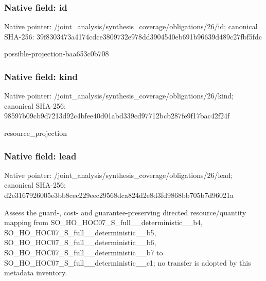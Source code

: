 \documentclass[10pt,a4paper]{article}
\begin{document}
\subsubsection{Native field: id}
Native pointer: /joint\_\allowbreak{}analysis/synthesis\_\allowbreak{}coverage/obligations/26/id; canonical SHA-256: 39f8303473a4174cdce3809732e978dd3904540eb691b96639d489c27fbf5fdc

\begingroup\raggedright\sloppy possible-projection-baa653c0b708\par\endgroup

\subsubsection{Native field: kind}
Native pointer: /joint\_\allowbreak{}analysis/synthesis\_\allowbreak{}coverage/obligations/26/kind; canonical SHA-256: 98597b09cb9d7213d92c4bfee40d01abd339cd97712bcb287fe9f17bac42f24f

\begingroup\raggedright\sloppy resource\_\allowbreak{}projection\par\endgroup

\subsubsection{Native field: lead}
Native pointer: /joint\_\allowbreak{}analysis/synthesis\_\allowbreak{}coverage/obligations/26/lead; canonical SHA-256: d2e3167926005e3bb8cec229eec29568dca824d2e8d3fd9868bb705b7d96021a

\begingroup\raggedright\sloppy Assess the guard-,\allowbreak{} cost- and guarantee-preserving directed resource/\allowbreak{}quantity mapping from SO\_\allowbreak{}HO\_\allowbreak{}HOC07\_\allowbreak{}S\_\allowbreak{}full\_\allowbreak{}\_\allowbreak{}deterministic\_\allowbreak{}\_\allowbreak{}b4,\allowbreak{} SO\_\allowbreak{}HO\_\allowbreak{}HOC07\_\allowbreak{}S\_\allowbreak{}full\_\allowbreak{}\_\allowbreak{}deterministic\_\allowbreak{}\_\allowbreak{}b5,\allowbreak{} SO\_\allowbreak{}HO\_\allowbreak{}HOC07\_\allowbreak{}S\_\allowbreak{}full\_\allowbreak{}\_\allowbreak{}deterministic\_\allowbreak{}\_\allowbreak{}b6,\allowbreak{} SO\_\allowbreak{}HO\_\allowbreak{}HOC07\_\allowbreak{}S\_\allowbreak{}full\_\allowbreak{}\_\allowbreak{}deterministic\_\allowbreak{}\_\allowbreak{}b7 to SO\_\allowbreak{}HO\_\allowbreak{}HOC07\_\allowbreak{}S\_\allowbreak{}full\_\allowbreak{}\_\allowbreak{}deterministic\_\allowbreak{}\_\allowbreak{}c1;\allowbreak{} no transfer is adopted by this metadata inventory.\par\endgroup
\end{document}
